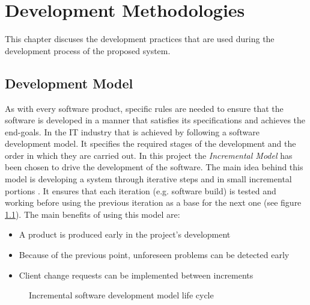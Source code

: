 \chapter{Development Methodologies}
\label{chapter:development_methodologies}
This chapter discuses the development practices that are used during the development process of the proposed system.  

\section{Development Model}
\label{section:development-model}
As with every software product, specific rules are needed to ensure that the software is developed in a manner that satisfies its specifications and achieves the end-goals. In the IT industry that is achieved by following a software development model. It specifies the required stages of the development and the order in which they are carried out. In this project the \textit{Incremental Model} has been chosen to drive the development of the software. The main idea behind this model is developing a system through iterative steps and in small incremental portions \citep[264]{bhuvaneswari2013}. It ensures that each iteration (e.g. software build) is tested and working before using the previous iteration as a base for the next one (see figure \ref{fig:incremental-model}). The main benefits of using this model are:

\begin{itemize}
    \item A product is produced early in the project's development
    \item Because of the previous point, unforeseen problems can be detected early
    \item Client change requests can be implemented between increments
\end{itemize}

    \begin{figure}[H]
        \centering
        \caption{Incremental software development model life cycle}
        \label{fig:incremental-model}
    \end{figure}


